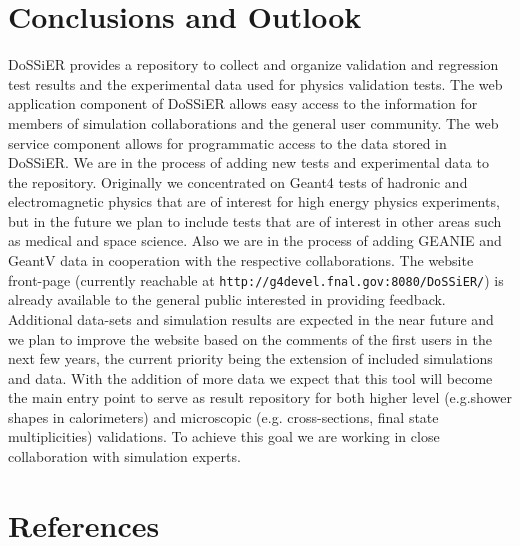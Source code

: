 \documentclass[a4paper]{jpconf}
\begin{document}
\section{Conclusions and Outlook}
DoSSiER provides a repository to collect and organize validation and regression test results and
the experimental data used for physics validation tests. The  web application component of DoSSiER allows easy access 
to the information for members of simulation collaborations and the general user community. 
The  web service component allows for programmatic access to the data
stored in DoSSiER.\@ 
We are in the process of adding new tests and experimental data to the repository. 
Originally we concentrated on Geant4 tests of hadronic and electromagnetic physics that are of interest for high energy physics 
experiments, but in the future we plan to include tests that are of interest in other areas such as medical and space science. Also
we are in the process of adding GEANIE and GeantV data in cooperation with the respective collaborations.
The website front-page (currently reachable at
\verb"http://g4devel.fnal.gov:8080/DoSSiER/") is already available to
the general public interested in providing feedback. 
Additional data-sets and simulation results are
expected in the near future and we plan to improve the website
based on the comments of the first users in the next few years, the
current priority being the extension of included simulations and data.
With the
addition of more data we expect that this tool will become the
main entry point to serve as result repository for both higher level
(e.g.\@ shower shapes in calorimeters) and microscopic (e.g.\@
cross-sections, final state multiplicities) validations. To achieve this
goal we are working in close collaboration with simulation experts. 
 \section*{References}
\end{document}

